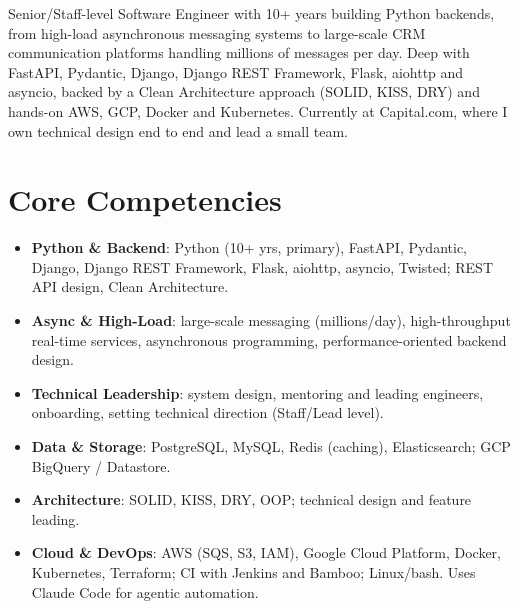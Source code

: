 \documentclass[11pt,a4paper,sans]{moderncv}
\begin{document}
\makecvtitle


\vspace{6pt}
\small{Senior/Staff-level Software Engineer with 10+ years building Python backends, from high-load asynchronous messaging systems to large-scale CRM communication platforms handling millions of messages per day. Deep with FastAPI, Pydantic, Django, Django REST Framework, Flask, aiohttp and asyncio, backed by a Clean Architecture approach (SOLID, KISS, DRY) and hands-on AWS, GCP, Docker and Kubernetes. Currently at Capital.com, where I own technical design end to end and lead a small team.}


\section{Core Competencies}
\vspace{1pt}
\begin{itemize}

\item \textbf{Python \& Backend}: Python (10+ yrs, primary), FastAPI, Pydantic, Django, Django REST Framework, Flask, aiohttp, asyncio, Twisted; REST API design, Clean Architecture.

\item \textbf{Async \& High-Load}: large-scale messaging (millions/day), high-throughput real-time services, asynchronous programming, performance-oriented backend design.

\item \textbf{Technical Leadership}: system design, mentoring and leading engineers, onboarding, setting technical direction (Staff/Lead level).

\item \textbf{Data \& Storage}: PostgreSQL, MySQL, Redis (caching), Elasticsearch; GCP BigQuery / Datastore.

\item \textbf{Architecture}: SOLID, KISS, DRY, OOP; technical design and feature leading.

\item \textbf{Cloud \& DevOps}: AWS (SQS, S3, IAM), Google Cloud Platform, Docker, Kubernetes, Terraform; CI with Jenkins and Bamboo; Linux/bash. Uses Claude Code for agentic automation.

\end{itemize}
\end{document}
